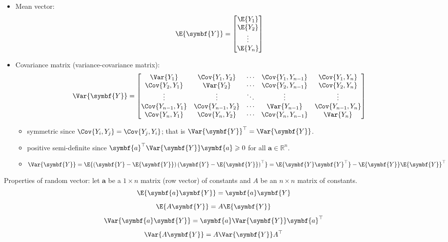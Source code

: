 \begin{itemize}
    \item Mean vector:
          \[ \E{\symbf{Y}}=\begin{bmatrix}
                  \E{Y_1} \\
                  \E{Y_2} \\
                  \vdots  \\
                  \E{Y_n}
              \end{bmatrix} \]
    \item Covariance matrix (variance-covariance matrix):
          \[ \Var{\symbf{Y}}=\begin{bmatrix}
                  \Var{Y_1}         & \Cov{Y_1,Y_2}     & \cdots & \Cov{Y_1,Y_{n-1}} & \Cov{Y_1,Y_n}     \\
                  \Cov{Y_2,Y_1}     & \Var{Y_2}         & \cdots & \Cov{Y_2,Y_{n-1}} & \Cov{Y_2,Y_n}     \\
                  \vdots            & \vdots            & \ddots & \vdots            & \vdots            \\
                  \Cov{Y_{n-1},Y_1} & \Cov{Y_{n-1},Y_2} & \cdots & \Var{Y_{n-1}}     & \Cov{Y_{n-1},Y_n} \\
                  \Cov{Y_n,Y_1}     & \Cov{Y_n,Y_2}     & \cdots & \Cov{Y_n,Y_{n-1}} & \Var{Y_n}
              \end{bmatrix} \]
          \begin{itemize}
              \item symmetric since $ \Cov{Y_i,Y_j}=\Cov{Y_j,Y_i} $; that is $ \Var{\symbf{Y}}^\top=\Var{\symbf{Y}} $.
              \item positive semi-definite since
                    $ \symbf{a}^\top\Var{\symbf{Y}}\symbf{a}\geqslant 0 $
                    for all $ \symbf{a}\in\mathbb{R}^n $.
              \item $ \Var{\symbf{Y}}=
                        \E{\left( \symbf{Y}-\E{\symbf{Y}} \right)\left( \symbf{Y}-\E{\symbf{Y}} \right)^\top}=\E{\symbf{Y}\symbf{Y}^\top}-\E{\symbf{Y}}\E{\symbf{Y}}^\top $
          \end{itemize}
\end{itemize}
Properties of random vector: let $ \symbf{a} $ be a $ 1\times n $
matrix (row vector) of constants and $ A $ be an $ n\times n $
matrix of constants.
\[ \E{\symbf{a}\symbf{Y}}=\symbf{a}\symbf{Y} \]
\[ \E{A\symbf{Y}}=A\E{\symbf{Y}} \]
\[ \Var{\symbf{a}\symbf{Y}}=\symbf{a}\Var{\symbf{Y}}\symbf{a}^\top \]
\[ \Var{A\symbf{Y}}=A\Var{\symbf{Y}}A^\top \]
